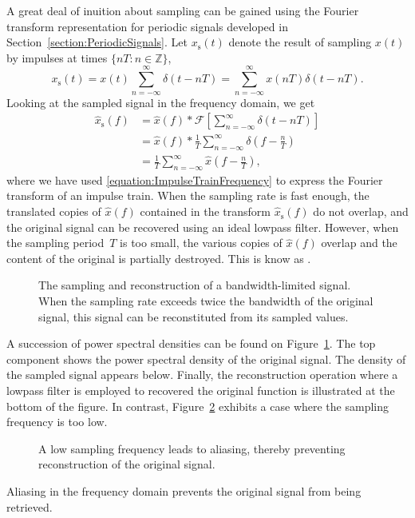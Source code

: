 A great deal of inuition about sampling can be gained using the Fourier transform representation for periodic signals developed in Section~\ref{section:PeriodicSignals}.
Let $x_{\mathrm{s}}(t)$ denote the result of sampling $x(t)$ by impulses at times $\{ nT : n \in \mathbb{Z} \}$,
\begin{equation*}
x_{\mathrm{s}}(t) = x(t) \sum_{n=-\infty}^{\infty} \delta(t-nT)
= \sum_{n=-\infty}^{\infty} x(nT) \delta(t-nT).
\end{equation*}
Looking at the sampled signal in the frequency domain, we get
\begin{equation*}\begin{split}
\hat{x}_{\mathrm{s}}(f) &= \hat{x}(f) \ast \mathcal{F} \left[ \sum_{n=-\infty}^{\infty} \delta(t-nT) \right] \\
&= \hat{x}(f) \ast \frac{1}{T} \sum_{n=-\infty}^{\infty} \delta \left( f-\frac{n}{T} \right) \\
&= \frac{1}{T} \sum_{n=-\infty}^{\infty} \hat{x} \left( f - \frac{n}{T} \right) ,\end{split}\end{equation*}
where we have used \eqref{equation:ImpulseTrainFrequency} to express the Fourier transform of an impulse train.
When the sampling rate is fast enough, the translated copies of $\hat{x}(f)$ contained in the transform $\hat{x}_{\mathrm{s}}(f)$ do not overlap, and the original signal can be recovered using an ideal lowpass filter.
However, when the sampling period~$T$ is too small, the various copies of $\hat{x}(f)$ overlap and the content of the original is partially destroyed.
This is know as .

\begin{figure}[thbp]
\begin{center}
\caption{The sampling and reconstruction of a bandwidth-limited signal.
When the sampling rate exceeds twice the bandwidth of the original signal, this signal can be reconstituted from its sampled values.}
\label{figure:Sampling}
\end{center}
\end{figure}
A succession of power spectral densities can be found on Figure~\ref{figure:Sampling}.
The top component shows the power spectral density of the original signal.
The density of the sampled signal appears below.
Finally, the reconstruction operation where a lowpass filter is employed to recovered the original function is illustrated at the bottom of the figure.
In contrast, Figure~\ref{figure:Aliasing} exhibits a case where the sampling frequency is too low.
\begin{figure}[thbp]
\begin{center}
\caption{A low sampling frequency leads to aliasing, thereby preventing reconstruction of the original signal.}
\label{figure:Aliasing}
\end{center}
\end{figure}
Aliasing in the frequency domain prevents the original signal from being retrieved.

